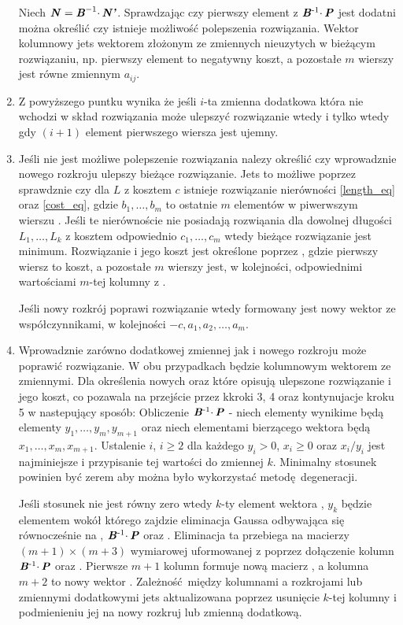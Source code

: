 \begin{enumerate}
Niech $\textbf{\textit{N}} = \textbf{\textit{B}}^{-1} \cdotp \textbf{\textit{N'}}$. Sprawdzając czy pierwszy element z $\textbf{\textit{B}}\textsuperscript{-1} \cdotp \textbf{\textit{P}}$ jest dodatni można określić czy istnieje możliwość polepszenia rozwiązania. Wektor kolumnowy  jets wektorem złożonym ze zmiennych nieuzytych w bieżącym rozwiązaniu, np. pierwszy element to negatywny koszt, a pozostałe $m$ wierszy jest równe zmiennym $a_{ij}$.

\item Z powyższego puntku wynika że jeśli $i$-ta zmienna dodatkowa która nie wchodzi w skład rozwiązania może ulepszyć rozwiązanie wtedy i tylko wtedy gdy $(i+1)$ element pierwszego wiersza  jest ujemny.

\item Jeśli nie jest możliwe polepszenie rozwiązania nalezy określić czy wprowadznie nowego rozkroju ulepszy bieżące rozwiązanie. Jets to możliwe poprzez sprawdznie czy dla $L$ z kosztem $c$ istnieje rozwiązanie nierówności \ref{length_eq} oraz \ref{cost_eq}, gdzie $b_1,\dots,b_m$ to ostatnie $m$ elementów w piwerwszym wierszu . Jeśli te nierównoście nie posiadają rozwiąania dla dowolnej długości $L_1,\dots,L_k$ z kosztem odpowiednio $c_1,\dots,c_m$ wtedy bieżące rozwiązanie jest minimum. Rozwiązanie i jego koszt jest określone poprzez , gdzie pierwszy wiersz to koszt, a pozostałe $m$ wierszy jest, w kolejności, odpowiednimi wartościami $m$-tej kolumny z .

Jeśli nowy rozkrój poprawi rozwiązanie wtedy formowany jest nowy wektor  ze współczynnikami, w kolejności $-c,a_1,a_2,\dots,a_m$.

\item Wprowadznie zarówno dodatkowej zmiennej jak i nowego rozkroju może poprawić rozwiązanie. W obu przypadkach  będzie kolumnowym wektorem ze zmiennymi. Dla określenia nowych  oraz  które opisują ulepszone rozwiązanie i jego koszt, co pozawala na przejście przez kkroki 3, 4 oraz kontynujacje kroku 5 w nastepujący sposób: Obliczenie $\textbf{\textit{B}}\textsuperscript{-1} \cdotp \textbf{\textit{P}}$ - niech elementy wynikime będą elementy $y_1,\dots,y_m,y_{m+1}$ oraz niech elementami bierzącego wektora  będą $x_1,\dots,x_m,x_{m+1}$. Ustalenie $i$, $ i \ge 2$ dla każdego $y_i > 0$, $x_i \ge 0$ oraz $x_i/y_i$ jest najminiejsze i przypisanie tej wartości do zmiennej $k$. Minimalny stosunek powinien być zerem aby można było wykorzystać metodę degeneracji.

Jeśli stosunek nie jest równy zero wtedy $k$-ty element wektora , $y_k$ będzie elementem wokół którego zajdzie eliminacja Gaussa odbywająca się równocześnie na , $\textbf{\textit{B}}\textsuperscript{-1} \cdotp \textbf{\textit{P}}$ oraz . Eliminacja ta przebiega na macierzy $(m+1) \times (m+3)$ wymiarowej  uformowanej z  poprzez dołączenie kolumn $\textbf{\textit{B}}\textsuperscript{-1} \cdotp \textbf{\textit{P}}$ oraz . Pierwsze $m+1$ kolumn  formuje nową macierz , a kolumna $m+2$ to nowy wektor . Zależność między kolumnami  a rozkrojami lub zmiennymi dodatkowymi jets aktualizowana poprzez usunięcie $k$-tej kolumny i podmienieniu jej na nowy rozkruj lub zmienną dodatkową.


\end{enumerate}
